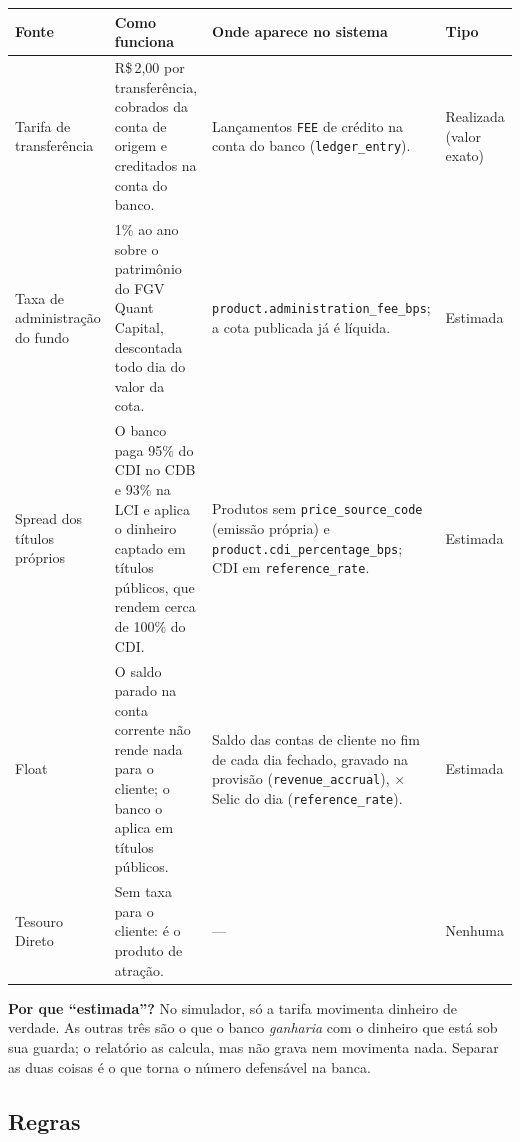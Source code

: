 \documentclass[11pt,a4paper]{article}
\newcommand{\fundo}{FGV Quant Capital}     %
\newcommand{\rs}{R\$\,}
\newcommand{\tb}[1]{\texttt{#1}}           %
\begin{document}
\begingroup\small
\begin{longtable}{@{}P{2.9cm}P{5.6cm}P{4.6cm}P{2.1cm}@{}}
\toprule
\textbf{Fonte} & \textbf{Como funciona} & \textbf{Onde aparece no sistema} & \textbf{Tipo} \\
\midrule
\endhead
Tarifa de transferência & \rs 2,00 por transferência, cobrados da conta de origem e creditados na conta do banco. & Lançamentos \tb{FEE} de crédito na conta do banco (\tb{ledger_entry}). & Realizada (valor exato) \\
Taxa de administração do fundo & 1\% ao ano sobre o patrimônio do \fundo, descontada todo dia do valor da cota. & \tb{product.administration_fee_bps}; a cota publicada já é líquida. & Estimada \\
Spread dos títulos próprios & O banco paga 95\% do CDI no CDB e 93\% na LCI e aplica o dinheiro captado em títulos públicos, que rendem cerca de 100\% do CDI. & Produtos sem \tb{price_source_code} (emissão própria) e \tb{product.cdi_percentage_bps}; CDI em \tb{reference_rate}. & Estimada \\
Float & O saldo parado na conta corrente não rende nada para o cliente; o banco o aplica em títulos públicos. & Saldo das contas de cliente no fim de cada dia fechado, gravado na provisão (\tb{revenue_accrual}), $\times$ Selic do dia (\tb{reference_rate}). & Estimada \\
Tesouro Direto & Sem taxa para o cliente: é o produto de atração. & --- & Nenhuma \\
\bottomrule
\end{longtable}
\endgroup

\textbf{Por que ``estimada''?} No simulador, só a tarifa movimenta dinheiro de verdade. As outras
três são o que o banco \emph{ganharia} com o dinheiro que está sob sua guarda; o relatório as calcula,
mas não grava nem movimenta nada. Separar as duas coisas é o que torna o número defensável na banca.

\subsection{Regras}
\end{document}
